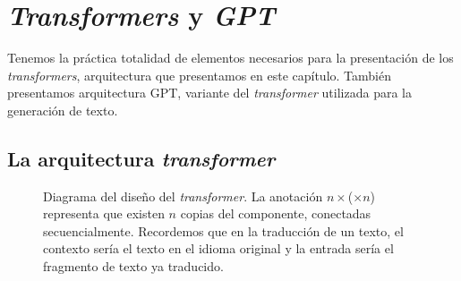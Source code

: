 \chapter{\textit{Transformers} y \textit{GPT}} \label{chapter5}
Tenemos la práctica totalidad de elementos necesarios para la presentación de los \textit{transformers}, arquitectura que presentamos en este capítulo. También presentamos arquitectura GPT, variante del \textit{transformer} utilizada para la generación de texto.

\section{La arquitectura \textit{transformer}}
\begin{figure}[tb]
    \centering
    
    \caption{Diagrama del diseño del \textit{transformer}. La anotación \( n × \)(\( × n \)) representa que existen \( n \) copias del componente, conectadas secuencialmente. Recordemos que en la traducción de un texto, el contexto sería el texto en el idioma original y la entrada sería el fragmento de texto ya traducido.}
    \label{fig:transformer}
\end{figure}

